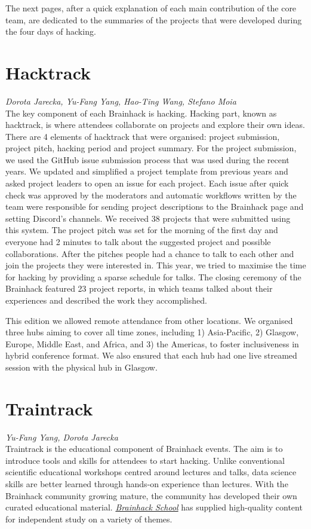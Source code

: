 \documentclass[10pt,a4paper,twocolumns]{proc}
\newcommand{\authors}[1]{\emph{\footnotesize #1} \\}
\begin{document}
The next pages, after a quick explanation of each main contribution of
the core team, are dedicated to the summaries of the projects that were
developed during the four days of hacking.

\section{Hacktrack}

\authors{Dorota Jarecka, %
Yu-Fang Yang, %
Hao-Ting Wang, %
Stefano Moia}
%

The key component of each Brainhack is hacking. Hacking part, known as
hacktrack, is where attendees collaborate on projects and explore their
own ideas. There are 4 elements of hacktrack that were organised:
project submission, project pitch, hacking period and project summary.
For the project submission, we used the GitHub issue submission process
that was used during the recent years. We updated and simplified a
project template from previous years and asked project leaders to open
an issue for each project. Each issue after quick check was approved by
the moderators and automatic workflows written by the team were
responsible for sending project descriptions to the Brainhack page and
setting Discord's channels. We received 38 projects that were submitted
using this system. The project pitch was set for the morning of the
first day and everyone had 2 minutes to talk about the suggested project
and possible collaborations. After the pitches people had a chance to
talk to each other and join the projects they were interested in. This
year, we tried to maximise the time for hacking by providing a sparse
schedule for talks. The closing ceremony of the Brainhack featured 23
project reports, in which teams talked about their experiences and
described the work they accomplished.

This edition we allowed remote attendance from other locations. We
organised three hubs aiming to cover all time zones, including 1)
Asia-Pacific, 2) Glasgow, Europe, Middle East, and Africa, and 3) the
Americas, to foster inclusiveness in hybrid conference format. We also
ensured that each hub had one live streamed session with the physical
hub in Glasgow.

\section{Traintrack}
\authors{Yu-Fang Yang, %
Dorota Jarecka}
%

Traintrack is the educational component of Brainhack events. The aim is
to introduce tools and skills for attendees to start hacking. Unlike
conventional scientific educational workshops centred around lectures
and talks, data science skills are better learned through hands-on
experience than lectures. With the Brainhack community growing mature,
the community has developed their own curated educational material.
\href{https://school.brainhackmtl.org/}{\emph{Brainhack School}} has
supplied high-quality content for independent study on a variety of
themes.
\end{document}
